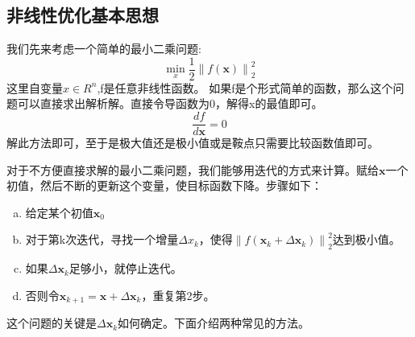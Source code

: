 \subsection{非线性优化基本思想}
我们先来考虑一个简单的最小二乘问题:
\begin{equation}
	\min_{x}\frac{1}{2}\left\|f(\boldsymbol{x})\right\|_{2}^{2}
\end{equation}
这里自变量$x \in R^n$,f是任意非线性函数。
如果f是个形式简单的函数，那么这个问题可以直接求出解析解。直接令导函数为0，解得x的最值即可。
\begin{equation}
	\frac{df}{d\boldsymbol{x}}=0
\end{equation}
解此方法即可，至于是极大值还是极小值或是鞍点只需要比较函数值即可。\par
对于不方便直接求解的最小二乘问题，我们能够用迭代的方式来计算。赋给$\boldsymbol{x}$一个初值，然后不断的更新这个变量，使目标函数下降。步骤如下：\par
\begin{enumerate}[(a)]
	\item 给定某个初值$\boldsymbol{x}_0$
	\item 对于第k次迭代，寻找一个增量$\Delta x_k$，使得$\left\|f(\boldsymbol{x}_k+\Delta \boldsymbol{x}_k)\right\|_{2}^{2}$达到极小值。
	\item 如果$\Delta \boldsymbol{x}_k$足够小，就停止迭代。
	\item 否则令$\boldsymbol{x}_{k+1}=\boldsymbol{x}+\Delta \boldsymbol{x}_k$，重复第2步。
\end{enumerate}
这个问题的关键是$\Delta \boldsymbol{x}_k$如何确定。下面介绍两种常见的方法。

